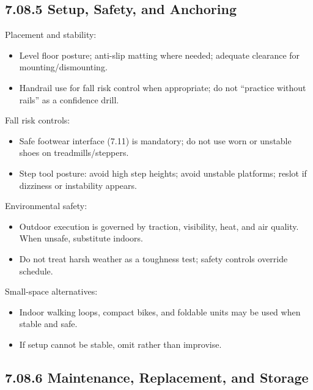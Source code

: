\documentclass[10pt]{article}
\begin{document}
\subsection*{7.08.5 Setup, Safety, and Anchoring}
{}

Placement and stability:

\begin{itemize}
\item Level floor posture; anti-slip matting where needed; adequate clearance for mounting/dismounting.
\item Handrail use for fall risk control when appropriate; do not “practice without rails” as a confidence drill.
\end{itemize}

Fall risk controls:

\begin{itemize}
\item Safe footwear interface (7.11) is mandatory; do not use worn or unstable shoes on treadmills/steppers.
\item Step tool posture: avoid high step heights; avoid unstable platforms; reslot if dizziness or instability appears.
\end{itemize}

Environmental safety:

\begin{itemize}
\item Outdoor execution is governed by traction, visibility, heat, and air quality. When unsafe, substitute indoors.
\item Do not treat harsh weather as a toughness test; safety controls override schedule.
\end{itemize}

Small-space alternatives:

\begin{itemize}
\item Indoor walking loops, compact bikes, and foldable units may be used when stable and safe.
\item If setup cannot be stable, omit rather than improvise.
\end{itemize}

\subsection*{7.08.6 Maintenance, Replacement, and Storage}
{}
\end{document}
